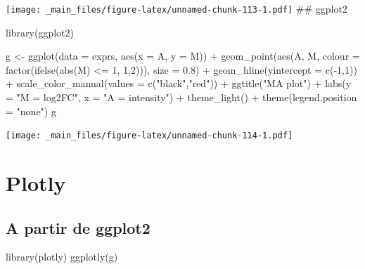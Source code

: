 \documentclass[
]{book}
\newenvironment{Shaded}{\begin{snugshade}}{\end{snugshade}}
\newcommand{\AttributeTok}[1]{\textcolor[rgb]{0.77,0.63,0.00}{#1}}
\newcommand{\DecValTok}[1]{\textcolor[rgb]{0.00,0.00,0.81}{#1}}
\newcommand{\FloatTok}[1]{\textcolor[rgb]{0.00,0.00,0.81}{#1}}
\newcommand{\FunctionTok}[1]{\textcolor[rgb]{0.00,0.00,0.00}{#1}}
\newcommand{\NormalTok}[1]{#1}
\newcommand{\OtherTok}[1]{\textcolor[rgb]{0.56,0.35,0.01}{#1}}
\newcommand{\SpecialCharTok}[1]{\textcolor[rgb]{0.00,0.00,0.00}{#1}}
\newcommand{\StringTok}[1]{\textcolor[rgb]{0.31,0.60,0.02}{#1}}
\begin{document}
\texttt{[image: \_main\_files/figure-latex/unnamed-chunk-113-1.pdf]}
\#\# ggplot2

\begin{Shaded}
\begin{Highlighting}[]
\FunctionTok{library}\NormalTok{(ggplot2)}

\NormalTok{g }\OtherTok{\textless{}{-}} \FunctionTok{ggplot}\NormalTok{(}\AttributeTok{data =}\NormalTok{ exprs, }\FunctionTok{aes}\NormalTok{(}\AttributeTok{x =}\NormalTok{ A, }\AttributeTok{y =}\NormalTok{ M)) }\SpecialCharTok{+}
  \FunctionTok{geom\_point}\NormalTok{(}\FunctionTok{aes}\NormalTok{(A, M, }\AttributeTok{colour =} \FunctionTok{factor}\NormalTok{(}\FunctionTok{ifelse}\NormalTok{(}\FunctionTok{abs}\NormalTok{(M) }\SpecialCharTok{\textless{}=} \DecValTok{1}\NormalTok{, }\DecValTok{1}\NormalTok{,}\DecValTok{2}\NormalTok{))), }\AttributeTok{size =} \FloatTok{0.8}\NormalTok{) }\SpecialCharTok{+} 
  \FunctionTok{geom\_hline}\NormalTok{(}\AttributeTok{yintercept =} \FunctionTok{c}\NormalTok{(}\SpecialCharTok{{-}}\DecValTok{1}\NormalTok{,}\DecValTok{1}\NormalTok{)) }\SpecialCharTok{+}
  \FunctionTok{scale\_color\_manual}\NormalTok{(}\AttributeTok{values =} \FunctionTok{c}\NormalTok{(}\StringTok{"black"}\NormalTok{,}\StringTok{"red"}\NormalTok{)) }\SpecialCharTok{+}
  \FunctionTok{ggtitle}\NormalTok{(}\StringTok{"MA plot"}\NormalTok{) }\SpecialCharTok{+} 
  \FunctionTok{labs}\NormalTok{(}\AttributeTok{y =} \StringTok{"M = log2FC"}\NormalTok{, }\AttributeTok{x =} \StringTok{"A = intensity"}\NormalTok{) }\SpecialCharTok{+} 
  \FunctionTok{theme\_light}\NormalTok{() }\SpecialCharTok{+} \FunctionTok{theme}\NormalTok{(}\AttributeTok{legend.position =} \StringTok{"none"}\NormalTok{)}
\NormalTok{g}
\end{Highlighting}
\end{Shaded}

\texttt{[image: \_main\_files/figure-latex/unnamed-chunk-114-1.pdf]}

\hypertarget{plotly}{%
\section{Plotly}\label{plotly}}

\hypertarget{a-partir-de-ggplot2}{%
\subsection{A partir de ggplot2}\label{a-partir-de-ggplot2}}

\begin{Shaded}
\begin{Highlighting}[]
\FunctionTok{library}\NormalTok{(plotly)}
\FunctionTok{ggplotly}\NormalTok{(g)}
\end{Highlighting}
\end{Shaded}
\end{document}
